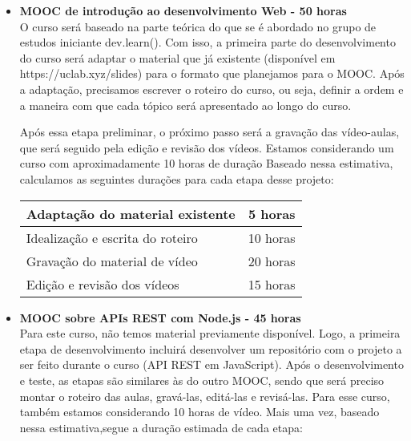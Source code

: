 \documentclass[10pt,twoside,a4paper]{article}
\begin{document}
  \begin{itemize}
    \item \textbf{MOOC de introdução ao desenvolvimento Web - 50 horas} \\
        O curso será baseado na parte teórica do que se é abordado no grupo de estudos iniciante dev.learn(). Com isso, a primeira parte do desenvolvimento do curso será adaptar o material que já existente (disponível em https://uclab.xyz/slides) para o formato que planejamos para o MOOC. Após a adaptação, precisamos escrever o roteiro do curso, ou seja, definir a ordem e a maneira com que cada tópico será apresentado ao longo do curso.

        Após essa etapa preliminar, o próximo passo será a gravação das vídeo-aulas, que será seguido pela edição e revisão dos vídeos. Estamos considerando um curso com aproximadamente 10 horas de duração Baseado nessa estimativa, calculamos as seguintes durações  para cada etapa desse projeto:

        
        \begin{center}
            \begin{tabular}{ |l|c| } 
                \hline
                     Adaptação do material existente & 5 horas \\
                     \hline
                     Idealização e escrita do roteiro & 10 horas \\
                     \hline
                     Gravação do material de vídeo & 20 horas \\
                     \hline
                     Edição e revisão dos vídeos & 15 horas \\
                \hline
            \end{tabular}
        \end{center}
    
    \item \textbf{MOOC sobre APIs REST com Node.js - 45 horas} \\
        Para este curso, não temos material previamente disponível. Logo, a primeira etapa de desenvolvimento incluirá desenvolver um repositório com o projeto a ser feito durante o curso (API REST em JavaScript). Após o desenvolvimento e teste, as etapas são similares às do outro MOOC, sendo que será preciso montar o roteiro das aulas, gravá-las, editá-las e revisá-las. Para esse curso, também estamos considerando 10 horas de vídeo. Mais uma vez, baseado nessa estimativa,segue a duração estimada de cada etapa:
        

\end{itemize}
\end{document}
